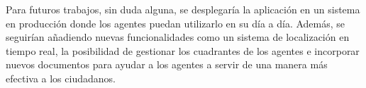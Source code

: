 Para futuros trabajos, sin duda alguna, se desplegaría la aplicación en un sistema en producción donde los agentes puedan utilizarlo en su día
a día. Además, se seguirían añadiendo nuevas funcionalidades como un sistema de localización en tiempo real, la posibilidad de gestionar los cuadrantes de los agentes e incorporar nuevos documentos para ayudar a los agentes a servir de una manera más efectiva a los ciudadanos.